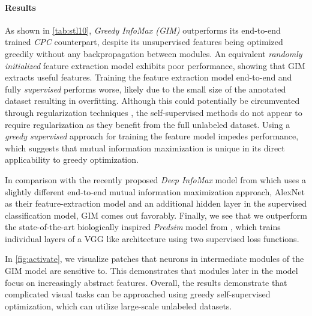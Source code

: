 \documentclass{article}
\begin{document}
\paragraph{Results} As shown in \cref{tab:stl10}, \textit{Greedy InfoMax (GIM)} outperforms its end-to-end trained \textit{CPC} counterpart, despite its unsupervised features being optimized greedily without any backpropagation between modules. An equivalent \textit{randomly initialized} feature extraction model exhibits poor performance, showing that GIM extracts useful features. Training the feature extraction model end-to-end and fully \textit{supervised} performs worse, likely due to the small size of the annotated dataset resulting in overfitting. Although this could potentially be circumvented through regularization techniques \citep{devries2017improved}, the self-supervised methods do not appear to require regularization as they benefit from the full unlabeled dataset. Using a \textit{greedy supervised} approach for training the feature model impedes performance, which suggests that mutual information maximization is unique in its direct applicability to greedy optimization.

In comparison with the recently proposed
\textit{Deep InfoMax} model from \citet{hjelm2018learning} which uses a slightly different end-to-end mutual information maximization approach, AlexNet \citep{krizhevsky2012imagenet} as their feature-extraction model and an additional hidden layer in the supervised classification model, GIM comes out favorably. Finally, we see that we outperform the state-of-the-art biologically inspired \textit{Predsim} model from \citet{nokland2019training}, which trains individual layers of a VGG like architecture \citep{simonyan2014very} using two supervised loss functions. 

In \cref{fig:activate}, we visualize patches that neurons in intermediate modules of the GIM model are sensitive to. This demonstrates that modules later in the model focus on increasingly abstract features. Overall, the results demonstrate that complicated visual tasks can be approached using greedy self-supervised optimization, which can utilize large-scale unlabeled datasets. 
\end{document}
